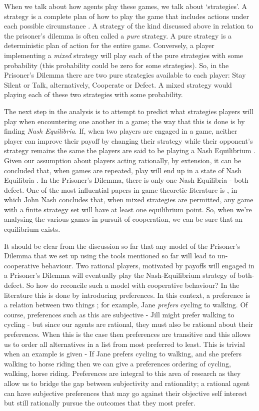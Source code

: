 \documentclass[11pt]{article}
\newcommand*{\np}{\par\noindent\newline}
\begin{document}
\np When we talk about how agents play these games, we talk about `strategies'. A strategy is a complete plan of how to
play the game that includes actions under each possible circumstance \citep{angner_course_2012}. A strategy of the kind
discussed above in relation to the prisoner's dilemma is often called a \textit{pure} strategy. A pure strategy is a
deterministic plan of action for the entire game. Conversely, a player implementing a \textit{mixed} strategy will play
each of the pure strategies with some probability (this probability could be zero for some strategies). So, in the
Prisoner's Dilemma there are two pure strategies available to each player: Stay Silent or Talk, alternatively, Cooperate
or Defect. A mixed strategy would playing each of these two strategies with some probability.

\np The next step in the analysis is to attempt to predict what strategies players will play when encountering one
another in a game; the way that this is done is by finding \textit{Nash Equilibria}. If, when two players are engaged in
a game, neither player can improve their payoff by changing their strategy while their opponent's strategy remains the
same the players are said to be playing a Nash Equilibrium \citep{angner_course_2012}. Given our assumption about
players acting rationally, by extension, it can be concluded that, when games are repeated, play will end up in a state
of Nash Equilibria \citep{kalai_rational_1993}. In the Prisoner's Dilemma, there is only one Nash Equilibria - both
defect. One of the most influential papers in game theoretic literature is \citep{nash_equilibrium_1950}, in which John
Nash concludes that, when mixed strategies are permitted, any game with a finite strategy set will have at least one equilibrium point. So, when we're analysing the various games in pursuit of cooperation, we can be sure that an equilibrium exists.

\np It should be clear from the discussion so far that any model of the Prisoner's Dilemma that we set up using 
the tools mentioned so far will lead to un-cooperative behaviour. Two rational players, motivated by payoffs will
engaged in a Prisoner's Dilemma will eventually play the Nash-Equilibrium strategy of both-defect. So how do reconcile
such a model with cooperative behaviour? In the literature this is done by introducing preferences. In this context, a
preference is a relation between two things \citep{angner_course_2012}; for example, Jane \textit{prefers} cycling to
walking. Of course, preferences such as this are subjective - Jill might prefer walking to cycling - but since our
agents are rational, they must also be rational about their preferences. When this is the case then preferences are
transitive and this allows us to order all alternatives in a list from most preferred to least. This is trivial when an
example is given - If Jane prefers cycling to walking, and she prefers walking to horse riding then we can give a
preferences ordering of cycling, walking, horse riding. Preferences are integral to this area of research as they allow
us to bridge the gap between subjectivity and rationality; a rational agent can have subjective preferences that may go
against their objective self interest but still rationally pursue the outcomes that they most prefer.
\end{document}
